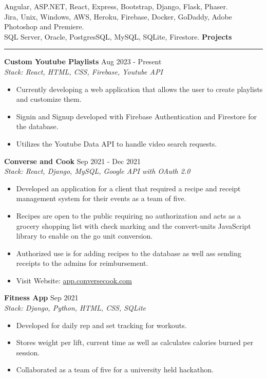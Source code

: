 \documentclass{article}
\begin{document}
	 Angular, ASP.NET, React, Express, Bootstrap, Django, Flask, Phaser.\\
	 Jira, Unix, Windows, AWS, Heroku, Firebase, Docker, GoDaddy, Adobe Photoshop and Premiere. \\
	 SQL Server, Oracle, PostgresSQL, MySQL, SQLite, Firestore.
\vspace{2mm}
\hfill\break
\noindent \textbf{Projects}
\vspace{1mm}
\hrule
\vspace{1mm}
\hfill\break
 \textbf {Custom Youtube Playlists} \hfill Aug 2023 - Present \\
\textit {Stack: React, HTML, CSS, Firebase, Youtube API}
\begin{itemize}[noitemsep, nolistsep]
	\item {Currently developing a web application that allows the user to create playlists and customize them.}
	\item {Signin and Signup developed with Firebase Authentication and Firestore for the database.}
	\item {Utilizes the Youtube Data API to handle video search requests.}
\end{itemize}

\noindent \textbf {Converse and Cook} \hfill Sep 2021 - Dec 2021 \\
\textit {Stack: React, Django, MySQL, Google API with OAuth 2.0}
\begin{itemize}[noitemsep, nolistsep]
	\item {Developed an application for a client that required a recipe and receipt management system for their events as a team of five.}
	\item {Recipes are open to the public requiring no authorization and acts as a grocery shopping list with check marking and the convert-units JavaScript library to enable on the go unit conversion.}
	\item{Authorized use is for adding recipes to the database as well ass sending receipts to the admins for reimbursement.}
	\item {Visit Website:
	\href{http://app.conversecook.com}{app.conversecook.com}
	}
\end{itemize}

\noindent \textbf {Fitness App} \hfill Sep 2021 \\
\textit {Stack: Django, Python, HTML, CSS, SQLite}
\begin{itemize}[noitemsep, nolistsep]
	\item {Developed for daily rep and set tracking for workouts.}
	\item {Stores weight per lift, current time as well as calculates calories burned per session.}
	\item {Collaborated as a team of five for a university held hackathon.}
\end{itemize}
\end{document}
